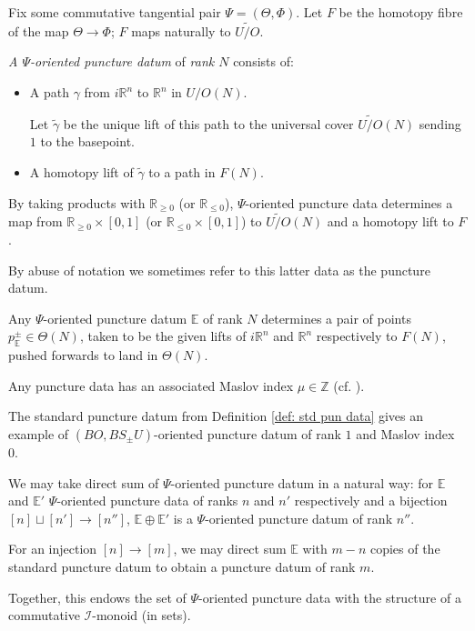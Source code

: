 \documentclass{TPmod}
\def\bE{\mathbb{E}}
\def\bR{\mathbb{R}}
\def\bZ{\mathbb{Z}}
\newcommand{\cI}{\mathcal{I}}
\def\bZ{\mathbb{Z}}
\numberwithin{equation}{section}
\begin{document}
    Fix some commutative tangential pair $\Psi = (\Theta, \Phi)$. Let $F$ be the homotopy fibre of the map $\Theta \to \Phi$; $F$ maps naturally to $\widetilde{U/O}$.
    \begin{defn}
        \emph{A $\Psi$-oriented puncture datum} of \emph{rank $N$} consists of:
        \begin{itemize}
            \item A path $\gamma$ from $i\bR^n$ to $\bR^n$ in $U/O(N)$.
            
            Let $\widetilde \gamma$ be the unique lift of this path to the universal cover $\widetilde{U/O}(N)$ sending $1$ to the basepoint.
            \item A homotopy lift of $\widetilde \gamma$ to a path in $F(N)$.
        \end{itemize}
        By taking products with $\bR_{\geq 0}$ (or $\bR_{\leq 0}$), $\Psi$-oriented puncture data determines a map from $\bR_{\geq 0} \times [0,1]$ (or $\bR_{\leq 0} \times [0,1]$) to $\widetilde{U/O}(N)$ and a homotopy lift to $F$.
        
        By abuse of notation we sometimes refer to this latter data as the puncture datum.
    \end{defn}
    \begin{rmk}\label{rmk: 2 pts punc dat}
        Any $\Psi$-oriented puncture datum $\bE$ of rank $N$ determines a pair of points $p_\bE^\pm \in \Theta(N)$, taken to be the given lifts of $i\bR^n$ and $\bR^n$ respectively to $F(N)$, pushed forwards to land in $\Theta(N)$.
    \end{rmk}
    Any puncture data has an associated Maslov index $\mu \in \bZ$ (cf. \cite[Section 11(h)]{Seidel:book}).
    \begin{ex}
        The standard puncture datum from Definition \ref{def: std pun data} gives an example of $(BO, BS_\pm U)$-oriented puncture datum of rank $1$ and Maslov index 0. 
    \end{ex}
    \begin{rmk}
        We may take direct sum of $\Psi$-oriented puncture datum in a natural way: for $\bE$ and $\bE'$ $\Psi$-oriented puncture data of ranks $n$ and $n'$ respectively and a bijection $[n] \sqcup [n'] \to [n'']$, $\bE \oplus \bE'$ is a $\Psi$-oriented puncture datum of rank $n''$.

        For an injection $[n] \to [m]$, we may direct sum $\bE$ with $m-n$ copies of the standard puncture datum to obtain a puncture datum of rank $m$.
        
        Together, this endows the set of $\Psi$-oriented puncture data with the structure of a commutative $\cI$-monoid (in sets).
    \end{rmk}
\end{document}
